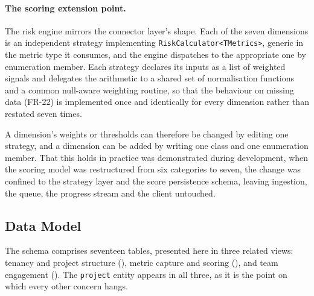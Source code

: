 \paragraph{The scoring extension point.}
The risk engine mirrors the connector layer's shape. Each of the seven dimensions
is an independent strategy implementing \texttt{RiskCalculator<TMetrics>},
generic in the metric type it consumes, and the engine dispatches to the
appropriate one by enumeration member. Each strategy declares its inputs as a
list of weighted signals and delegates the arithmetic to a shared set of
normalisation functions and a common null-aware weighting routine, so that the
behaviour on missing data (FR-22) is implemented once and identically for every
dimension rather than restated seven times.

A dimension's weights or thresholds can therefore be changed by editing one
strategy, and a dimension can be added by writing one class and one enumeration
member. That this holds in practice was demonstrated during development, when the
scoring model was restructured from six categories to seven, the change was
confined to the strategy layer and the score persistence schema, leaving
ingestion, the queue, the progress stream and the client untouched.


\subsection{Data Model}
\label{subsec:data-model}

The schema comprises seventeen tables, presented here in three related views:
tenancy and project structure (), metric capture and
scoring (), and team engagement ().
The \texttt{project} entity appears in all three, as it is the point on which
every other concern hangs.

